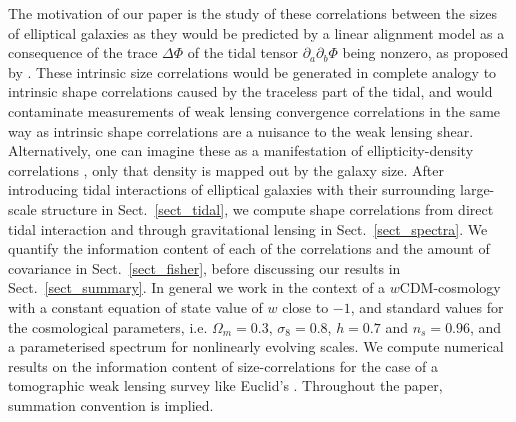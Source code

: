 \documentclass[a4paper,fleqn,usenatbib]{mnras}
\begin{document}
The motivation of our paper is the study of these correlations between the sizes of elliptical galaxies as they would be predicted by a linear alignment model as a consequence of the trace $\Delta\Phi$ of the tidal tensor $\partial_a\partial_b\Phi$ being nonzero, as proposed by \citet{hirata_galaxy-galaxy_2004, hirata_intrinsic_2010}. These intrinsic size correlations would be generated in complete analogy to intrinsic shape correlations caused by the traceless part of the tidal, and would contaminate measurements of weak lensing convergence correlations \cite{alsing_weak_2014} in the same way as intrinsic shape correlations are a nuisance to the weak lensing shear. Alternatively, one can imagine these as a manifestation of ellipticity-density correlations \citep{2002astro.ph..5512H}, only that density is mapped out by the galaxy size. After introducing tidal interactions of elliptical galaxies with their surrounding large-scale structure in Sect.~\ref{sect_tidal}, we compute shape correlations from direct tidal interaction and through gravitational lensing in Sect.~\ref{sect_spectra}. We quantify the information content of each of the correlations and the amount of covariance in Sect.~\ref{sect_fisher}, before discussing our results in Sect.~\ref{sect_summary}. In general we work in the context of a $w$CDM-cosmology with a constant equation of state value of $w$ close to $-1$, and standard values for the cosmological parameters, i.e. $\Omega_m = 0.3$, $\sigma_8 =  0.8$, $h = 0.7$ and $n_s = 0.96$, and a parameterised spectrum for nonlinearly evolving scales. We compute numerical results on the information content of size-correlations for the case of a tomographic weak lensing survey like Euclid's \cite{Amendola:2016saw}. Throughout the paper, summation convention is implied.


\end{document}
